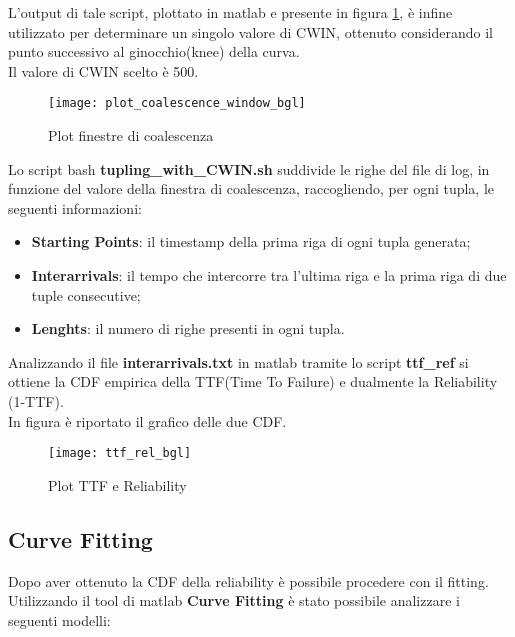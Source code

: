 L'output di tale script, plottato in matlab e presente in figura \ref{plot_coalescence_window_bgl},
è infine utilizzato per determinare un singolo valore di CWIN, ottenuto
considerando il punto successivo al ginocchio(knee) della curva.\\
Il valore di CWIN scelto è 500.\\
\begin{figure}[!htbp]
  \texttt{[image: plot\_coalescence\_window\_bgl]}
  \caption{Plot finestre di coalescenza}
  \label{plot_coalescence_window_bgl}
\end{figure}

Lo script bash \textbf{tupling\_with\_CWIN.sh} suddivide le righe del file di log,
in funzione del valore della finestra di coalescenza, raccogliendo, per ogni tupla,
le seguenti informazioni:

\begin{itemize}
  \item \textbf{Starting Points}: il timestamp della prima riga di ogni tupla generata;
  \item \textbf{Interarrivals}: il tempo che intercorre tra l'ultima riga e la
  prima riga di due tuple consecutive;
  \item \textbf{Lenghts}: il numero di righe presenti in ogni tupla.
\end{itemize}

Analizzando il file \textbf{interarrivals.txt} in matlab tramite lo script \textbf{ttf\_ref}
si ottiene la CDF empirica della TTF(Time To Failure) e dualmente la Reliability (1-TTF).\\
In figura è riportato il grafico delle due CDF.

\begin{figure}[!htbp]
  \centering
  \texttt{[image: ttf\_rel\_bgl]}
  \caption{Plot TTF e Reliability}
  \label{ttf_rel_bgl}
\end{figure}


\subsection{Curve Fitting}

Dopo aver ottenuto la CDF della reliability è possibile procedere con il fitting.\\
Utilizzando il tool di matlab \textbf{Curve Fitting} è stato possibile
analizzare i seguenti modelli:

\clearpage

